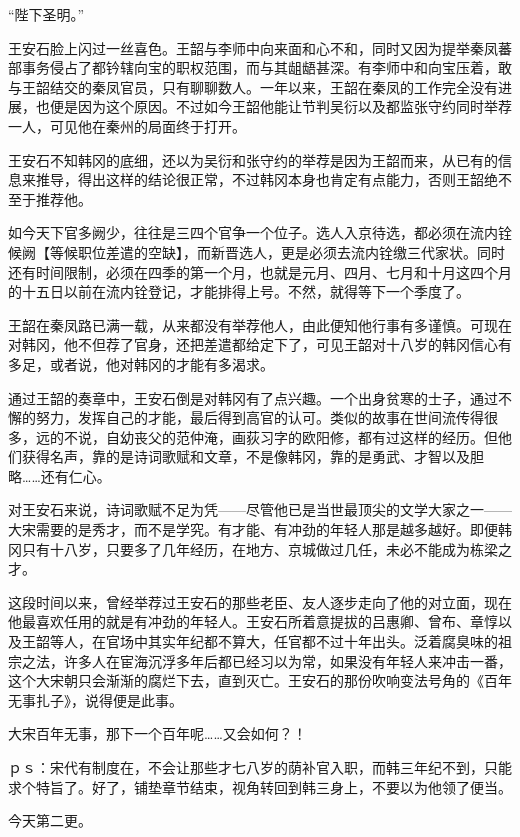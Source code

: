 “陛下圣明。”

王安石脸上闪过一丝喜色。王韶与李师中向来面和心不和，同时又因为提举秦凤蕃部事务侵占了都钤辖向宝的职权范围，而与其龃龉甚深。有李师中和向宝压着，敢与王韶结交的秦凤官员，只有聊聊数人。一年以来，王韶在秦凤的工作完全没有进展，也便是因为这个原因。不过如今王韶他能让节判吴衍以及都监张守约同时举荐一人，可见他在秦州的局面终于打开。

王安石不知韩冈的底细，还以为吴衍和张守约的举荐是因为王韶而来，从已有的信息来推导，得出这样的结论很正常，不过韩冈本身也肯定有点能力，否则王韶绝不至于推荐他。

如今天下官多阙少，往往是三四个官争一个位子。选人入京待选，都必须在流内铨候阙【等候职位差遣的空缺】，而新晋选人，更是必须去流内铨缴三代家状。同时还有时间限制，必须在四季的第一个月，也就是元月、四月、七月和十月这四个月的十五日以前在流内铨登记，才能排得上号。不然，就得等下一个季度了。

王韶在秦凤路已满一载，从来都没有举荐他人，由此便知他行事有多谨慎。可现在对韩冈，他不但荐了官身，还把差遣都给定下了，可见王韶对十八岁的韩冈信心有多足，或者说，他对韩冈的才能有多渴求。

通过王韶的奏章中，王安石倒是对韩冈有了点兴趣。一个出身贫寒的士子，通过不懈的努力，发挥自己的才能，最后得到高官的认可。类似的故事在世间流传得很多，远的不说，自幼丧父的范仲淹，画荻习字的欧阳修，都有过这样的经历。但他们获得名声，靠的是诗词歌赋和文章，不是像韩冈，靠的是勇武、才智以及胆略……还有仁心。

对王安石来说，诗词歌赋不足为凭——尽管他已是当世最顶尖的文学大家之一——大宋需要的是秀才，而不是学究。有才能、有冲劲的年轻人那是越多越好。即便韩冈只有十八岁，只要多了几年经历，在地方、京城做过几任，未必不能成为栋梁之才。

这段时间以来，曾经举荐过王安石的那些老臣、友人逐步走向了他的对立面，现在他最喜欢任用的就是有冲劲的年轻人。王安石所着意提拔的吕惠卿、曾布、章惇以及王韶等人，在官场中其实年纪都不算大，任官都不过十年出头。泛着腐臭味的祖宗之法，许多人在宦海沉浮多年后都已经习以为常，如果没有年轻人来冲击一番，这个大宋朝只会渐渐的腐烂下去，直到灭亡。王安石的那份吹响变法号角的《百年无事扎子》，说得便是此事。

大宋百年无事，那下一个百年呢……又会如何？！

ｐｓ：宋代有制度在，不会让那些才七八岁的荫补官入职，而韩三年纪不到，只能求个特旨了。好了，铺垫章节结束，视角转回到韩三身上，不要以为他领了便当。

今天第二更。

